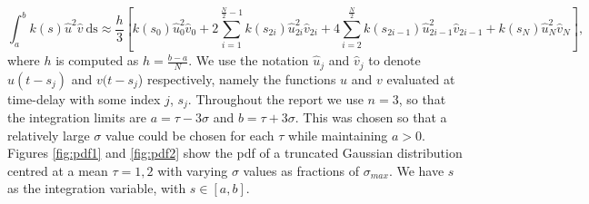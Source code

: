 \begin{equation}\label{simp}\int_{a}^{b}k(s)\hat{u}^2\hat{v}\  \text{ds}\approx\frac{h}{3}\left[k(s_0)\hat{u}^2_0\hat{v}_0+2\sum_{i=1}^{\frac{N}{2}-1}k(s_{2i})\hat{u}^2_{2i}\hat{v}_{2i}+4\sum_{i=2}^{\frac{N}{2}}k(s_{2i-1})\hat{u}^2_{2i-1}\hat{v}_{2i-1}+k(s_N)\hat{u}^2_N\hat{v}_N\right],
\end{equation}
where $h$ is computed as $h=\frac{b-a}{N}$. We use the notation $\hat{u}_j$ and $\hat{v}_j$ to denote $u(t-s_j)$ and $v(t-s_j$) respectively, namely the functions $u$ and $v$ evaluated at time-delay with some index $j$, $s_j$. Throughout the report we use $n=3$, so that the integration limits are $a=\tau-3\sigma$ and $b=\tau+3\sigma$. This was chosen so that a relatively large $\sigma$ value could be chosen for each $\tau$ while maintaining $a>0$.
Figures \ref{fig:pdf1} and \ref{fig:pdf2} show the pdf of a truncated Gaussian distribution centred at a mean $\tau=1,2$ with varying $\sigma$ values as fractions of $\sigma_{max}$. We have $s$ as the integration variable, with $s\in[a,b]$.

